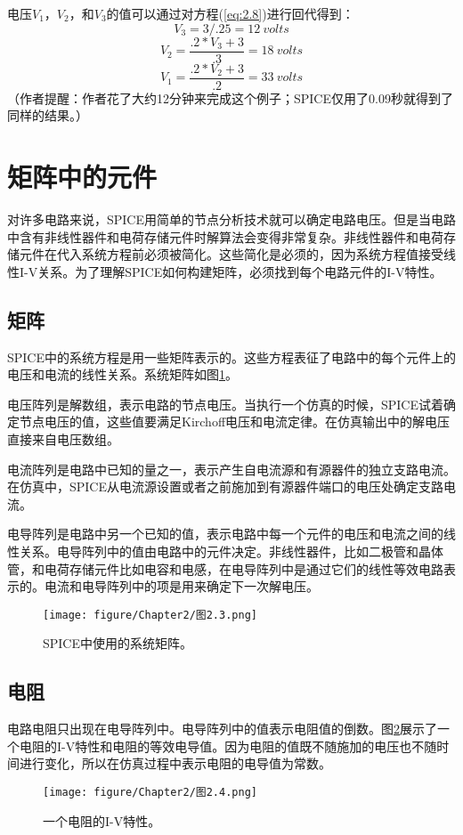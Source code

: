 电压$V_1$，$V_2$，和$V_3$的值可以通过对方程(\ref{eq:2.8})进行回代得到：
\begin{equation}
    V_3=3/.25=12\ volts
    \label{eq:2.9}
\end{equation}
\begin{equation}
    V_2=\frac{.2*V_3+3}{.3}=18\ volts
    \label{eq:2.10}
\end{equation}
\begin{equation}
    V_1=\frac{.2*V_2+3}{.2}=33\ volts
    \label{eq:2.11}
\end{equation}
（作者提醒：作者花了大约12分钟来完成这个例子；SPICE仅用了0.09秒就得到了同样的结果。）

\section{矩阵中的元件}
对许多电路来说，SPICE用简单的节点分析技术就可以确定电路电压。但是当电路中含有非线性器件和电荷存储元件时解算法会变得非常复杂。非线性器件和电荷存储元件在代入系统方程前必须被简化。这些简化是必须的，因为系统方程值接受线性I-V关系。为了理解SPICE如何构建矩阵，必须找到每个电路元件的I-V特性。

\subsection{矩阵}
SPICE中的系统方程是用一些矩阵表示的。这些方程表征了电路中的每个元件上的电压和电流的线性关系。系统矩阵如图\ref{图2.3}。

电压阵列是解数组，表示电路的节点电压。当执行一个仿真的时候，SPICE试着确定节点电压的值，这些值要满足Kirchoff电压和电流定律。在仿真输出中的解电压直接来自电压数组。

电流阵列是电路中已知的量之一，表示产生自电流源和有源器件的独立支路电流。在仿真中，SPICE从电流源设置或者之前施加到有源器件端口的电压处确定支路电流。

电导阵列是电路中另一个已知的值，表示电路中每一个元件的电压和电流之间的线性关系。电导阵列中的值由电路中的元件决定。非线性器件，比如二极管和晶体管，和电荷存储元件比如电容和电感，在电导阵列中是通过它们的线性等效电路表示的。电流和电导阵列中的项是用来确定下一次解电压。
\begin{figure}[htbp]
\small
    \centering
    \texttt{[image: figure/Chapter2/图2.3.png]}
    \caption{SPICE中使用的系统矩阵。}
    \label{图2.3}
\end{figure}

\subsection{电阻}
电路电阻只出现在电导阵列中。电导阵列中的值表示电阻值的倒数。图\ref{图2.4}展示了一个电阻的I-V特性和电阻的等效电导值。因为电阻的值既不随施加的电压也不随时间进行变化，所以在仿真过程中表示电阻的电导值为常数。
\begin{figure}[htbp]
\small
    \centering
    \texttt{[image: figure/Chapter2/图2.4.png]}
    \caption{一个电阻的I-V特性。}
    \label{图2.4}
\end{figure}


